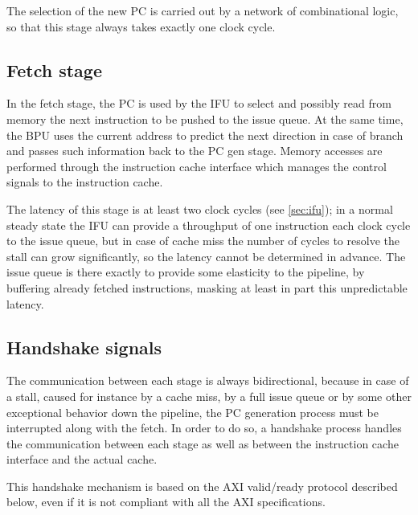 The selection of the new \ac{PC} is carried out by a network of combinational logic, so that this stage always takes exactly one clock cycle.

\subsection{Fetch stage}
In the fetch stage, the \ac{PC} is used by the \acf{IFU} to select and possibly read from memory the next instruction to be pushed to the issue queue. At the same time, the \acf{BPU} uses the current address to predict the next direction in case of branch and passes such information back to the \ac{PC} gen stage. Memory accesses are performed through the instruction cache interface which manages the control signals to the instruction cache. 

The latency of this stage is at least two clock cycles (see \cref{sec:ifu}); in a normal steady state the \ac{IFU} can provide a throughput of one instruction each clock cycle to the issue queue, but in case of cache miss the number of cycles to resolve the stall can grow significantly, so the latency cannot be determined in advance. The issue queue is there exactly to provide some elasticity to the pipeline, by buffering already fetched instructions, masking at least in part this unpredictable latency.

\subsection{Handshake signals}\label{sec:handshake}
The communication between each stage is always bidirectional, because in case of a stall, caused for instance by a cache miss, by a full issue queue or by some other exceptional behavior down the pipeline, the \ac{PC} generation process must be interrupted along with the fetch. In order to do so, a handshake process handles the communication between each stage as well as between the instruction cache interface and the actual cache.

This handshake mechanism is based on the {\smaller AXI} valid/ready protocol described below, even if it is not compliant with all the {\smaller AXI} specifications.

